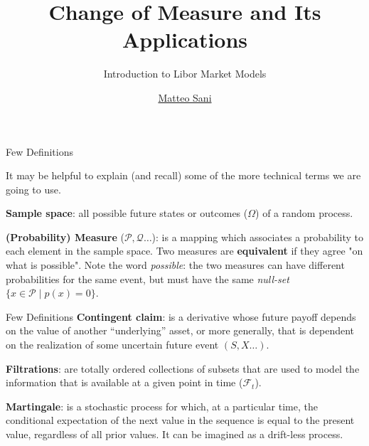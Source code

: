 \documentclass{beamer}
\title{Change of Measure and Its Applications}
\subtitle{Introduction to Libor Market Models}
\author{\href{mailto:matteo.sani@unisi.it}{Matteo Sani}}
\begin{document}
	\begin{frame}[plain]
		\maketitle
	\end{frame}

\begin{frame}{Few Definitions}


It may be helpful to explain (and recall) some of the more technical terms we are going to use.\newline

\textbf{Sample space}: all possible future states or outcomes ($\Omega$) of a random process.\newline

\textbf{(Probability) Measure} ($\mathcal{P}, \mathcal{Q}\ldots$): is a mapping which associates a probability to each element in the sample space. Two measures are \textbf{equivalent} if they agree "on what is possible". Note the word \emph{possible}: the two measures can have different probabilities for the same event, but must have the same \emph{null-set} $\{x\in {\mathcal {P}}\mid p (x)=0\}$. 
\end{frame}

\begin{frame}{Few Definitions}
\textbf{Contingent claim}: is a derivative whose future payoff depends on the value of another “underlying” asset, or more generally, that is dependent on the realization of some uncertain future event $(S, X\ldots)$.\newline

\textbf{Filtrations}: are totally ordered collections of subsets that are used to model the information that is available at a given point in time ($\mathcal{F}_t$). \newline

\textbf{Martingale}: is a stochastic process for which, at a particular time, the conditional expectation of the next value in the sequence is equal to the present value, regardless of all prior values. It can be imagined as a drift-less process.
\end{frame}
\end{document}
